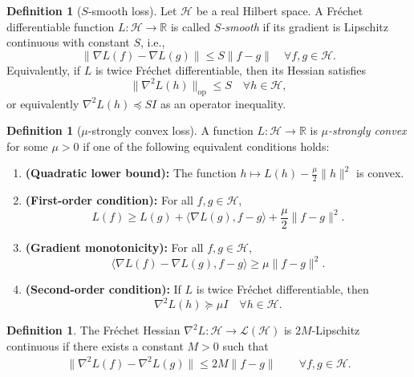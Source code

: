 \documentclass{article}
\theoremstyle{plain}
\theoremstyle{definition}
\newtheorem{definition}[theorem]{Definition}
\theoremstyle{remark}
\begin{document}
\begin{definition}[$S$-smooth loss]
Let $\mathcal H$ be a real Hilbert space. A Fr\'echet differentiable function
$L : \mathcal H \to \mathbb R$ is called \emph{$S$-smooth} if its gradient is Lipschitz continuous
with constant $S$, i.e.,
\[
\|\nabla L(f) - \nabla L(g)\| \le S \|f - g\|
\quad \forall f,g \in \mathcal H.
\]
Equivalently, if $L$ is twice Fr\'echet differentiable, then its Hessian satisfies
\[
\|\nabla^2 L(h)\|_{\mathrm{op}} \le S
\quad \forall h \in \mathcal H,
\]
or equivalently $\nabla^2 L(h) \preceq S I$ as an operator inequality.
\end{definition}

\begin{definition}[$\mu$-strongly convex loss]
A function $L : \mathcal H \to \mathbb R$ is \emph{$\mu$-strongly convex} for some $\mu>0$ if one
of the following equivalent conditions holds:
\begin{enumerate}
    \item \textbf{(Quadratic lower bound):}
    The function $h \mapsto L(h) - \frac{\mu}{2}\|h\|^2$ is convex.
    \item \textbf{(First-order condition):}
    For all $f,g \in \mathcal H$,
    \[
    L(f) \ge L(g) + \langle \nabla L(g), f-g\rangle
    + \frac{\mu}{2}\|f-g\|^2.
    \]
    \item \textbf{(Gradient monotonicity):}
    For all $f,g \in \mathcal H$,
    \[
    \langle \nabla L(f) - \nabla L(g), f-g\rangle \ge \mu \|f-g\|^2.
    \]
    \item \textbf{(Second-order condition):}
    If $L$ is twice Fr\'echet differentiable, then
    \[
    \nabla^2 L(h) \succeq \mu I
    \quad \forall h \in \mathcal H.
    \]
\end{enumerate}
\end{definition}

\begin{definition}
The Fr\'echet Hessian $\nabla^2 L : \mathcal{H} \to \mathcal{L(H)}$ is $2M$-Lipschitz continuous if there exists a constant $M>0$ such that
    \begin{align*}
        \|\nabla^2L(f)-\nabla^2L(g)\| \leq 2M\|f-g\| \qquad \forall f,g\in \mathcal{H}.
    \end{align*}
\end{definition}



\end{document}
